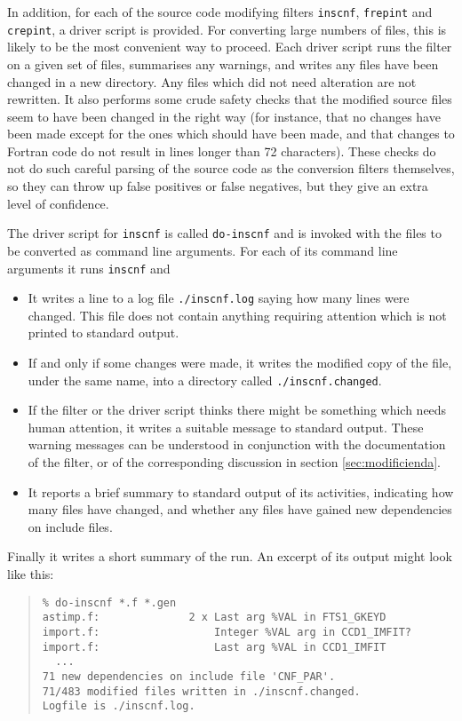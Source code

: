 \documentclass[twoside,11pt]{article}
\newcommand{\htmlref}[2]{#1}
\renewcommand{\_}{\texttt{\symbol{95}}}
\newcommand{\xroutine}[1]{\htmlref{{\tt #1}}{#1}}
\newcommand{\xdofilter}[1]{\htmlref{{\tt do-#1}}{do-xxx}}
\newcommand{\file}[1]{{\tt #1}}
\newenvironment{squote}{\begin{quote}\begin{small}}{\end{small}\end{quote}}
\begin{document}
In addition, for each of the source code modifying filters
\xroutine{inscnf}, \xroutine{frepint} and \xroutine{crepint},
a driver script is provided.
For converting large numbers of files, this is likely to be the
most convenient way to proceed.  Each driver script
runs the filter on a given set of files, summarises any warnings, and
writes any files have been changed in a new directory.
Any files which did not need alteration are not rewritten.
It also performs some crude safety checks that the modified source
files seem to have been changed in the right way (for instance, that
no changes have been made except for the ones which should have been
made, and that changes to Fortran code do not result in lines longer
than 72 characters).
These checks do not do such careful parsing
of the source code as the conversion filters themselves,
so they can throw up false positives or false negatives, but they give
an extra level of confidence.

The driver script for \xroutine{inscnf} is called \xdofilter{inscnf}
and is invoked with the files to be converted as command line arguments.
For each of its command line arguments it runs \xroutine{inscnf} and
\begin{itemize}
\item It writes a line to a log file \file{./inscnf.log}
      saying how many lines were changed.  This file does not contain
      anything requiring attention which is not printed to standard output.
\item If and only if some changes were made, it writes the modified copy
      of the file, under the same name,
      into a directory called \file{./inscnf.changed}.
\item If the filter or the driver script thinks there might be something
      which needs human attention, it writes a suitable message to standard
      output.  These warning messages can be understood in conjunction
      with the documentation of the filter, or of the corresponding
      discussion in section \ref{sec:modificienda}.
\item It reports a brief summary to standard output of its activities,
      indicating how many files have changed, and whether any files have
      gained new dependencies on include files.
\end{itemize}
Finally it writes a short summary of the run.
An excerpt of its output might look like this:
\begin{squote}
\begin{verbatim}
% do-inscnf *.f *.gen
astimp.f:              2 x Last arg %VAL in FTS1_GKEYD
import.f:                  Integer %VAL arg in CCD1_IMFIT?
import.f:                  Last arg %VAL in CCD1_IMFIT
  ...
71 new dependencies on include file 'CNF_PAR'.
71/483 modified files written in ./inscnf.changed.
Logfile is ./inscnf.log.
\end{verbatim}
\end{squote}
\end{document}
